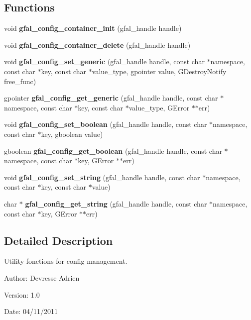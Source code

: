 \subsection*{Functions}
\begin{CompactItemize}
\item 
void \textbf{gfal\_\-config\_\-container\_\-init} (gfal\_\-handle handle)\label{gfal__common__config_8c_f4d0feecfb7d37db0c9e43fda98cf30b}

\item 
void \textbf{gfal\_\-config\_\-container\_\-delete} (gfal\_\-handle handle)\label{gfal__common__config_8c_4a50cdc068fe4366702ccb19dcbf7646}

\item 
void \textbf{gfal\_\-config\_\-set\_\-generic} (gfal\_\-handle handle, const char $\ast$namespace, const char $\ast$key, const char $\ast$value\_\-type, gpointer value, GDestroy\-Notify free\_\-func)\label{gfal__common__config_8c_9fec9e3b5f839efd708d6392b35ea49e}

\item 
gpointer \textbf{gfal\_\-config\_\-get\_\-generic} (gfal\_\-handle handle, const char $\ast$namespace, const char $\ast$key, const char $\ast$value\_\-type, GError $\ast$$\ast$err)\label{gfal__common__config_8c_ff916c741227f108a1422611419fe812}

\item 
void \textbf{gfal\_\-config\_\-set\_\-boolean} (gfal\_\-handle handle, const char $\ast$namespace, const char $\ast$key, gboolean value)\label{gfal__common__config_8c_95f648ce0b3e7da48163b072bcf80c68}

\item 
gboolean \textbf{gfal\_\-config\_\-get\_\-boolean} (gfal\_\-handle handle, const char $\ast$namespace, const char $\ast$key, GError $\ast$$\ast$err)\label{gfal__common__config_8c_d3b76d548cef5dad5897f2b2d3a8686b}

\item 
void \textbf{gfal\_\-config\_\-set\_\-string} (gfal\_\-handle handle, const char $\ast$namespace, const char $\ast$key, const char $\ast$value)\label{gfal__common__config_8c_1a9b755fbc1750e5bc13abeab0842795}

\item 
char $\ast$ \textbf{gfal\_\-config\_\-get\_\-string} (gfal\_\-handle handle, const char $\ast$namespace, const char $\ast$key, GError $\ast$$\ast$err)\label{gfal__common__config_8c_98bac19426ed2686fa2ba17fce1f2d77}

\end{CompactItemize}


\subsection{Detailed Description}
Utility fonctions for config management. 

\begin{Desc}
\item[Author:]Devresse Adrien \end{Desc}
\begin{Desc}
\item[Version:]1.0 \end{Desc}
\begin{Desc}
\item[Date:]04/11/2011 \end{Desc}
